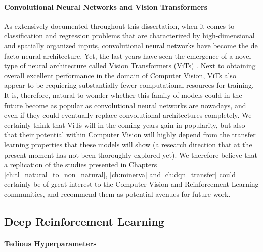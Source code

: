 \paragraph{\textbf{\uppercase{C}onvolutional \uppercase{N}eural \uppercase{N}etworks and \uppercase{V}ision \uppercase{T}ransformers}}
As extensively documented throughout this dissertation, when it comes to classification and regression problems that are characterized by high-dimensional and spatially organized inputs, convolutional neural networks have become the de facto neural architecture. Yet, the last years have seen the emergence of a novel type of neural architecture called Vision Transformers (ViTs) \cite{dosovitskiy2020image}. Next to obtaining overall excellent performance in the domain of Computer Vision, ViTs also appear to be requiering substantially fewer computational resources for training. It is, therefore, natural to wonder whether this family of models could in the future become as popular as convolutional neural networks are nowadays, and even if they could eventually replace convolutional architectures completely. We certainly think that ViTs will in the coming years gain in popularity, but also that their potential within Computer Vision will highly depend from the transfer learning properties that these models will show (a research direction that at the present moment has not been thoroughly explored yet). We therefore believe that a replication of the studies presented in Chapters \ref{ch:tl_natural_to_non_natural}, \ref{ch:minerva} and \ref{ch:dqn_transfer} could certainly be of great interest to the Computer Vision and Reinforcement Learning communities, and recommend them as potential avenues for future work.

\subsection{Deep Reinforcement Learning}
\paragraph{\textbf{\uppercase{T}edious \uppercase{H}yperparameters}}

